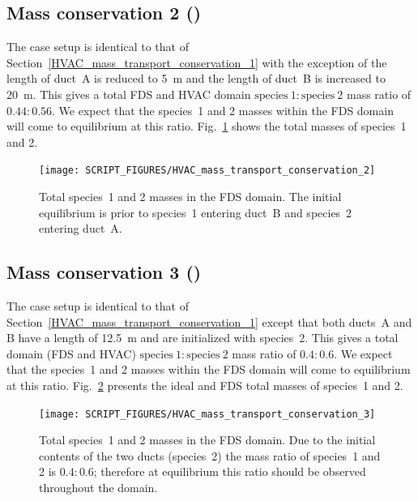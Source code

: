 \documentclass[11pt]{book}
\begin{document}
\subsection{Mass conservation 2 (\texorpdfstring{}{HVAC\_mass\_transport\_conservation\_2})}
\label{HVAC_mass_transport_conservation_2}
The case setup is identical to that of Section~\ref{HVAC_mass_transport_conservation_1} with the exception of the length of duct~A is reduced to \SI{5}{\meter} and the length of duct~B is increased to \SI{20}{\meter}. This gives a total FDS and HVAC domain \(\text{species}\ 1 \colon \text{species}\ 2\) mass ratio of \(0.44 \colon 0.56\). We expect that the species~1 and 2 masses within the FDS domain will come to equilibrium at this ratio. Fig.~\ref{fig_HVAC_mass_transport_conservation_2} shows the total masses of species~1 and 2.

\begin{figure}[ht]
\centering
\texttt{[image: SCRIPT\_FIGURES/HVAC\_mass\_transport\_conservation\_2]}
\caption[ test case.]{Total species~1 and 2 masses in the FDS domain. The initial equilibrium is prior to species~1 entering duct~B and species~2 entering duct~A.}
\label{fig_HVAC_mass_transport_conservation_2}
\end{figure}

\subsection{Mass conservation 3 (\texorpdfstring{}{HVAC\_mass\_transport\_conservation\_3})}
\label{HVAC_mass_transport_conservation_3}
The case setup is identical to that of Section~\ref{HVAC_mass_transport_conservation_1} except that both ducts~A and B have a length of \SI{12.5}{\meter} and are initialized with species~2. This gives a total domain (FDS and HVAC) \(\text{species}\ 1 \colon \text{species}\ 2\) mass ratio of \(0.4 \colon 0.6\). We expect that the species~1 and 2 masses within the FDS domain will come to equilibrium at this ratio. Fig.~\ref{fig_HVAC_mass_transport_conservation_3} presents the ideal and FDS total masses of species~1 and 2.

\begin{figure}[ht]
\centering
\texttt{[image: SCRIPT\_FIGURES/HVAC\_mass\_transport\_conservation\_3]}
\caption[ test case.]{Total species~1 and 2 masses in the FDS domain. Due to the initial contents of the two ducts (species~2) the mass ratio of species~1 and 2 is \(0.4 \colon 0.6\); therefore at equilibrium this ratio should be observed throughout the domain.}
\label{fig_HVAC_mass_transport_conservation_3}
\end{figure}
\end{document}
